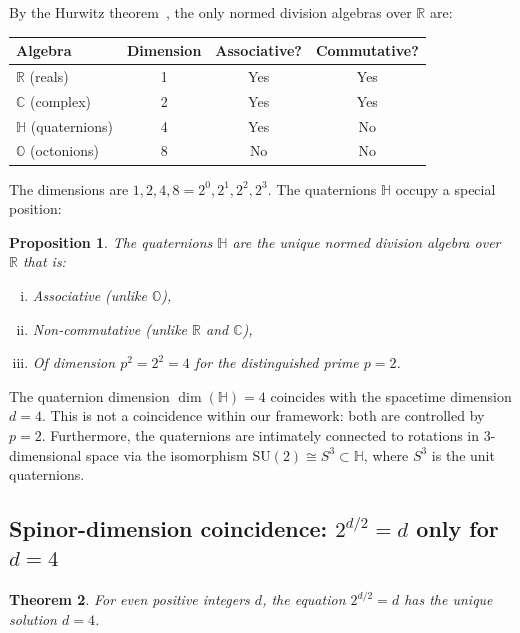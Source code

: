 \documentclass[12pt,a4paper]{article}
\newtheorem{theorem}{Theorem}[section]
\newtheorem{proposition}[theorem]{Proposition}
\theoremstyle{definition}
\newcommand{\RR}{\mathbb{R}}
\newcommand{\CC}{\mathbb{C}}
\newcommand{\HH}{\mathbb{H}}
\newcommand{\OO}{\mathbb{O}}
\begin{document}
By the Hurwitz theorem~\cite{Hurwitz1898}, the only normed division algebras over
$\RR$ are:
\begin{center}
\begin{tabular}{lccc}
\toprule
\textbf{Algebra} & \textbf{Dimension} & \textbf{Associative?} & \textbf{Commutative?} \\
\midrule
$\RR$ (reals) & 1 & Yes & Yes \\
$\CC$ (complex) & 2 & Yes & Yes \\
$\HH$ (quaternions) & 4 & Yes & No \\
$\OO$ (octonions) & 8 & No & No \\
\bottomrule
\end{tabular}
\end{center}

The dimensions are $1, 2, 4, 8 = 2^0, 2^1, 2^2, 2^3$. The quaternions $\HH$ occupy
a special position:

\begin{proposition}\label{prop:quaternion}
The quaternions $\HH$ are the unique normed division algebra over $\RR$ that is:
\begin{enumerate}[(i)]
  \item Associative (unlike $\OO$),
  \item Non-commutative (unlike $\RR$ and $\CC$),
  \item Of dimension $p^2 = 2^2 = 4$ for the distinguished prime $p=2$.
\end{enumerate}
\end{proposition}

The quaternion dimension $\dim(\HH) = 4$ coincides with the spacetime dimension $d=4$.
This is not a coincidence within our framework: both are controlled by $p=2$.
Furthermore, the quaternions are intimately connected to rotations in 3-dimensional
space via the isomorphism $\mathrm{SU}(2) \cong S^3 \subset \HH$, where $S^3$ is
the unit quaternions.

\subsection{Spinor-dimension coincidence: $2^{d/2} = d$ only for $d=4$}

\begin{theorem}\label{thm:spinor}
For even positive integers $d$, the equation $2^{d/2} = d$ has the unique solution
$d = 4$.
\end{theorem}
\end{document}

